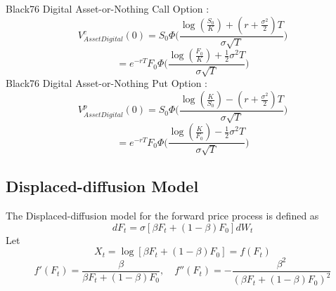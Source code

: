 \documentclass[fleqn,12pt]{SelfArx}
\begin{document}
Black76 Digital Asset-or-Nothing Call Option :
$$
V^{c}_{Asset Digital}(0) = S_0\Phi\Bigg(\frac{\log({\frac{S_0}{K}})+(r+\frac{\sigma^{2}}{2})T}{\sigma\sqrt{T}} \Bigg)
$$
$$
= e^{-rT}F_0\Phi\Bigg(\frac{\log({\frac{F_0}{K}})+\frac{1}{2}\sigma^{2}T}{\sigma\sqrt{T}}\Bigg)
$$
Black76 Digital Asset-or-Nothing Put Option :
$$
V^{p}_{Asset Digital}(0) =
S_0\Phi\Bigg(\frac{\log({\frac{K}{S_0}})-(r+\frac{\sigma^{2}}{2})T}{\sigma\sqrt{T}}\Bigg)
$$
$$
= e^{-rT}F_0\Phi\Bigg(\frac{\log({\frac{K}{F_0}})-\frac{1}{2}\sigma^{2}T}{\sigma\sqrt{T}}\Bigg)
$$

\subsection{Displaced-diffusion Model}
The Displaced-diffusion model for the forward price process is defined as
$$
dF_t = \sigma [\beta F_t + (1-\beta)F_0]dW_t
$$
Let $$X_t = \log[\beta F_t+(1-\beta)F_0] = f(F_t)$$
$$ f'(F_t) = \frac{\beta}{\beta F_t+(1-\beta ) F_0},\quad f''(F_t) = -\frac{\beta^{2}}{(\beta F_t+(1-\beta) F_0)^{2}} $$
\end{document}
